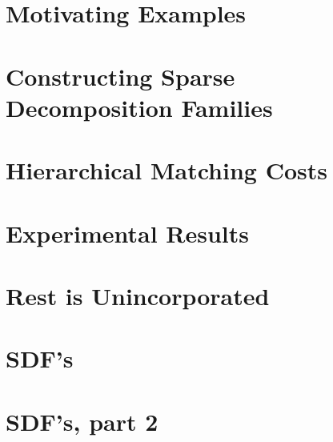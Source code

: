 \documentclass{book}
\begin{document}
  \section{Motivating Examples}

  \section{Constructing Sparse Decomposition Families}

  \section{Hierarchical Matching Costs}

  \section{Experimental Results}

  \section{Rest is Unincorporated}

  \section{SDF's}
    

  \section{SDF's, part 2}
    


%     
%     
%     
%    

%     

%     
%     
%     
%     





\backmatter

% 



\printindex
\end{document}
